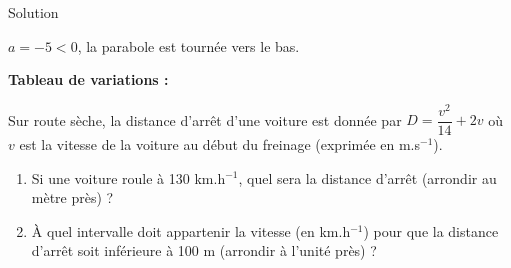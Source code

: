 \documentclass[a4paper,12pt]{article}
\begin{document}
\begin{solutionbox}{Solution}
\begin{enumerate}
    \(a = -5 < 0\), la parabole est tournée vers le bas.

    \textbf{Tableau de variations :}

    \begin{center}
    \end{center}

\end{enumerate}
\end{solutionbox}

\begin{exercice}[title=Exercice 27 \quad$\star\star$\quad\ {[Modéliser]}]{}{}
Sur route sèche, la distance d’arrêt d’une voiture est donnée par \( D = \dfrac{v^2}{14} + 2v \) où \( v \) est la vitesse de la voiture au début du freinage (exprimée en m.s\(^{-1}\)).
\begin{enumerate}
    \item Si une voiture roule à 130 km.h\(^{-1}\), quel sera la distance d’arrêt (arrondir au mètre près) ?
    \item À quel intervalle doit appartenir la vitesse (en km.h\(^{-1}\)) pour que la distance d’arrêt soit inférieure à 100 m (arrondir à l’unité près) ?
\end{enumerate}
\end{exercice}
\end{document}
